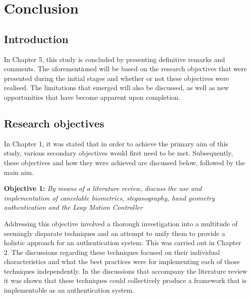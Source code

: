 \chapter{Conclusion}


\section{Introduction}

In Chapter 5, this study is concluded by presenting definitive remarks and comments. The aforementioned will be based on the research objectives that were presented during the initial stages and whether or not these objectives were realised. The limitations that emerged will also be discussed, as well as new opportunities that have become apparent upon completion.

\section{Research objectives}

In Chapter 1, it was stated that in order to achieve the primary aim of this study, various secondary objectives would first need to be met. Subsequently, these objectives and how they were achieved are discussed below, followed by the main aim.


\textbf{Objective 1:} \textit{By means of a literature review, discuss the use and implementation of cancelable biometrics, steganography, hand geometry authentication and the Leap Motion Controller}


Addressing this objective involved a thorough investigation into a multitude of seemingly disparate techniques and an attempt to unify them to provide a holistic approach for an authentication system. This was carried out in Chapter 2. The discussions regarding these techniques focused on their individual characteristics and what the best practices were for implementing each of those techniques independently. In the discussions that accompany the literature review it was shown that these techniques could collectively produce a framework that is implementable as an authentication system.\\

